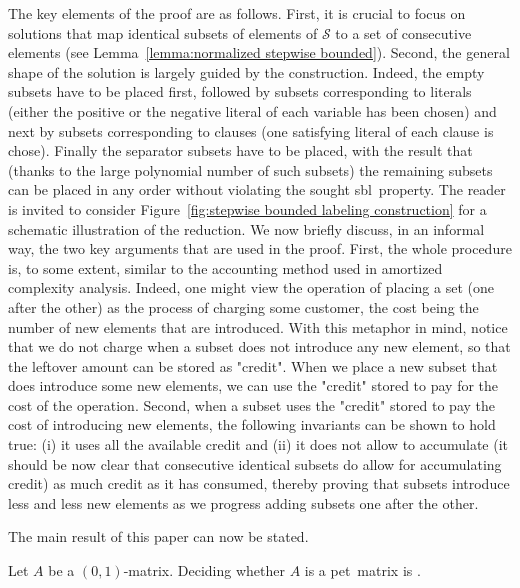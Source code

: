 \documentclass[a4paper,10pt]{llncs}
\newcommand{\PET}{pet}
\newcommand{\SBL}{sbl}
\begin{document}
The key elements of the proof are as follows.
First, it is crucial to focus on solutions that map identical subsets 
of elements of $\mathcal{S}$ to a set of consecutive elements
(see Lemma~\ref{lemma:normalized stepwise bounded}).
Second,
the general shape of the solution is largely guided by the construction.
Indeed,
the empty subsets have to be placed first, followed by subsets corresponding to literals 
(either the positive or the negative literal of each variable has been
chosen)
and next by subsets corresponding to clauses
(one satisfying literal of each clause is chose).
Finally the separator subsets have to be placed, with the result that 
(thanks to the large polynomial number of such subsets)
the remaining subsets can be placed in any order without violating
the sought \SBL\ property.
The reader is invited to consider 
Figure~\ref{fig:stepwise bounded labeling construction}
for a schematic illustration of the reduction.
We now briefly discuss, in an informal way, the two key arguments that are used in 
the proof.
First, the whole procedure is, to some extent, similar to 
the accounting method used in amortized complexity analysis. 
Indeed, one might view the operation of placing a set (one after the other)
as the process of charging some customer, the cost being the number of
new elements that are introduced.
With this metaphor in mind, notice that 
we do not charge when a subset does not introduce any new element,
so that the leftover amount can be stored as "credit". 
When we place a new subset that does introduce some new elements, 
we can use the "credit" stored to pay for the cost of the operation.
Second, when a subset uses the "credit" stored to pay the cost
of introducing new elements, the following invariants can be shown 
to hold true:
(i) it uses all the available credit and
(ii) it does not allow to accumulate 
(it should be now clear that consecutive identical subsets do allow
for accumulating credit)
as much credit as it has consumed,
thereby proving that subsets introduce less and less new elements as we progress
adding subsets one after the other.

The main result of this paper can now be stated.

\begin{theorem}
  \label{corollary:PAQ triangular is NPC}
  Let $A$ be a $(0,1)$-matrix.
  Deciding whether $A$ is a 
  \PET\ matrix is \NPC.
\end{theorem}


\end{document}
